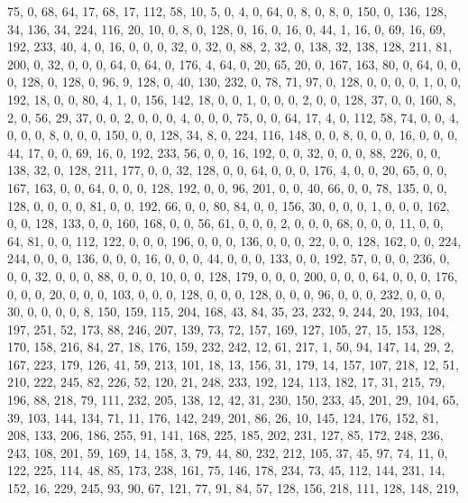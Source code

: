 \begin{DoxyCode}
       75, 0, 68, 64, 17, 68, 17, 112, 58, 10, 5, 0, 4, 0, 64, 0, 8, 0, 8, 0, 150, 0, 136, 128, 34, 136, 34, 224,
       116, 20, 10, 0, 8, 0, 128, 0, 16, 0, 16, 0, 44, 1, 16, 0, 69, 16, 69, 192, 233, 40, 4, 0, 16, 0, 0, 0, 32, 0,
       32, 0, 88, 2, 32, 0, 138, 32, 138, 128, 211, 81, 200, 0, 32, 0, 0, 0, 64, 0, 64, 0, 176, 4, 64, 0, 20, 65,
       20, 0, 167, 163, 80, 0, 64, 0, 0, 0, 128, 0, 128, 0, 96, 9, 128, 0, 40, 130, 232, 0, 78, 71, 97, 0, 128, 0,
       0, 0, 0, 1, 0, 0, 192, 18, 0, 0, 80, 4, 1, 0, 156, 142, 18, 0, 0, 1, 0, 0, 0, 2, 0, 0, 128, 37, 0, 0, 160,
       8, 2, 0, 56, 29, 37, 0, 0, 2, 0, 0, 0, 4, 0, 0, 0, 75, 0, 0, 64, 17, 4, 0, 112, 58, 74, 0, 0, 4, 0, 0, 0, 8,
       0, 0, 0, 150, 0, 0, 128, 34, 8, 0, 224, 116, 148, 0, 0, 8, 0, 0, 0, 16, 0, 0, 0, 44, 17, 0, 0, 69, 16, 0,
       192, 233, 56, 0, 0, 16, 192, 0, 0, 32, 0, 0, 0, 88, 226, 0, 0, 138, 32, 0, 128, 211, 177, 0, 0, 32, 128, 0, 0,
       64, 0, 0, 0, 176, 4, 0, 0, 20, 65, 0, 0, 167, 163, 0, 0, 64, 0, 0, 0, 128, 192, 0, 0, 96, 201, 0, 0, 40,
       66, 0, 0, 78, 135, 0, 0, 128, 0, 0, 0, 0, 81, 0, 0, 192, 66, 0, 0, 80, 84, 0, 0, 156, 30, 0, 0, 0, 1, 0, 0, 0,
       162, 0, 0, 128, 133, 0, 0, 160, 168, 0, 0, 56, 61, 0, 0, 0, 2, 0, 0, 0, 68, 0, 0, 0, 11, 0, 0, 64, 81, 0,
       0, 112, 122, 0, 0, 0, 196, 0, 0, 0, 136, 0, 0, 0, 22, 0, 0, 128, 162, 0, 0, 224, 244, 0, 0, 0, 136, 0, 0, 0,
       16, 0, 0, 0, 44, 0, 0, 0, 133, 0, 0, 192, 57, 0, 0, 0, 236, 0, 0, 0, 32, 0, 0, 0, 88, 0, 0, 0, 10, 0, 0,
       128, 179, 0, 0, 0, 200, 0, 0, 0, 64, 0, 0, 0, 176, 0, 0, 0, 20, 0, 0, 0, 103, 0, 0, 0, 128, 0, 0, 0, 128, 0, 0,
       0, 96, 0, 0, 0, 232, 0, 0, 0, 30, 0, 0, 0, 0, 8, 150, 159, 115, 204, 168, 43, 84, 35, 23, 232, 9, 244, 20,
       193, 104, 197, 251, 52, 173, 88, 246, 207, 139, 73, 72, 157, 169, 127, 105, 27, 15, 153, 128, 170, 158, 216,
       84, 27, 18, 176, 159, 232, 242, 12, 61, 217, 1, 50, 94, 147, 14, 29, 2, 167, 223, 179, 126, 41, 59, 213,
       101, 18, 13, 156, 31, 179, 14, 157, 107, 218, 12, 51, 210, 222, 245, 82, 226, 52, 120, 21, 248, 233, 192, 124,
       113, 182, 17, 31, 215, 79, 196, 88, 218, 79, 111, 232, 205, 138, 12, 42, 31, 230, 150, 233, 45, 201, 29,
       104, 65, 39, 103, 144, 134, 71, 11, 176, 142, 249, 201, 86, 26, 10, 145, 124, 176, 152, 81, 208, 133, 206,
       186, 255, 91, 141, 168, 225, 185, 202, 231, 127, 85, 172, 248, 236, 243, 108, 201, 59, 169, 14, 158, 3, 79, 44,
       80, 232, 212, 105, 37, 45, 97, 74, 11, 0, 122, 225, 114, 48, 85, 173, 238, 161, 75, 146, 178, 234, 73, 45,
       112, 144, 231, 14, 152, 16, 229, 245, 93, 90, 67, 121, 77, 91, 84, 57, 128, 156, 218, 111, 128, 148, 219,

\end{DoxyCode}
